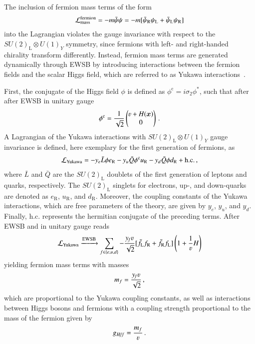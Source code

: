 The inclusion of fermion mass terms of the form
\begin{align*}
  \mathcal{L}_{\text{mass}}^{\text{fermion}} = - m \bar{\psi} \psi = - m [ \bar{\psi}_\text{R} \psi_\text{L} + \bar{\psi}_\text{L} \psi_\text{R} ]
\end{align*}
into the Lagrangian violates the gauge invariance with respect to the
$SU(2)_{\text{L}} \otimes U(1)_Y$ symmetry, since fermions with left- and
right-handed chirality transform differently. Instead, fermion mass terms are
generated dynamically through EWSB by introducing interactions between the
fermion fields and the scalar Higgs field, which are referred to as Yukawa
interactions~\cite{Yukawa:1935xg}.

First, the conjugate of the Higgs field $\phi$ is defined as
$\phi^{\text{c}} = i \sigma_2 \phi^*$, such that after after EWSB in unitary
gauge
\begin{align*}
  \phi^{\text{c}} = \frac{1}{\sqrt{2}}
  \begin{pmatrix}
    \varv + H(\myvec{x}) \\
    0
  \end{pmatrix} \,\text{.}
\end{align*}
A Lagrangian of the Yukawa interactions with $SU(2)_{\text{L}} \otimes U(1)_Y$
gauge invariance is defined, here exemplary for the first generation of
fermions, as
\begin{align}
  \mathcal{L}_{\text{Yukawa}} =
  - y_e \bar{L} \phi e_{\text{R}}
  - y_u \bar{Q} \phi^{\text{c}} u_{\text{R}}
  - y_d \bar{Q} \phi d_{\text{R}}
  + \text{h.c.} \,\text{,}
  \label{eq:lagrangian_yukawa}
\end{align}
where $\bar{L}$ and $\bar{Q}$ are the $SU(2)_{\text{L}}$ doublets of the first
generation of leptons and quarks, respectively. The $SU(2)_{\text{L}}$ singlets
for electrons, up-, and down-quarks are denoted as $e_{\text{R}}$,
$u_{\text{R}}$, and $d_{\text{R}}$. Moreover, the coupling constants of the
Yukawa interactions, which are free parameters of the theory, are given by
$y_e$, $y_u$, and $y_d$. Finally, $\text{h.c.}$ represents the hermitian
conjugate of the preceding terms. After EWSB and in unitary gauge
 reads
\begin{align*}
  \lagrange_{\text{Yukawa}} \xrightarrow{\text{EWSB}} \sum_{f \in \{e, u, d\}} -\frac{y_{\hspace{-0.1em}f} \varv}{\sqrt{2}} [ \bar{f}_{\text{L}} f_{\text{R}} + \bar{f}_{\text{R}} f_{\text{L}} ] \left( 1 + \frac{1}{\varv} H \right)
\end{align*}
yielding fermion mass terms with masses
\begin{align*}
  m_{f} = \frac{y_{\hspace{-0.1em}f} \varv}{\sqrt{2}} \,\text{,}
\end{align*}
which are proportional to the Yukawa coupling constants, as well as interactions
between Higgs bosons and fermions with a coupling strength proportional to the
mass of the fermion given by
\begin{align*}
  g_{H\!f\!f} = \frac{m_f}{\varv} \,\text{.}
\end{align*}

